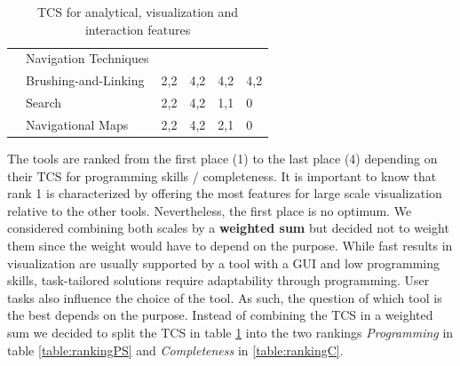 \begin{table}[H]
\begin{tabular}{|l| l l l l l|}
        \rowcolor{gray!30}\cellcolor{white}& Navigation Techniques & & & &\\\cline{2-6}
        & Brushing-and-Linking   & 2,2 & 4,2 & 4,2 & 4,2\\
        & Search                & 2,2 & 4,2 & 1,1 & 0 \\
        & Navigational Maps     & 2,2 & 4,2 & 2,1 & 0 \\
        \hline
    \end{tabular}
    \caption[\gls{TCS} for Analytical, Visualization and Interaction Features]{\gls{TCS} for analytical, visualization and interaction features}
    \label{table:TCS}
    \end{table}
    


 The tools are ranked from the first place  (1) to the last place (4) depending on their \gls{TCS} for programming skills / completeness.  It is important to know that rank 1 is characterized by offering the most features for large scale visualization relative to the other tools. Nevertheless, the first place is no optimum. We considered combining both scales by a \textbf{weighted sum} but decided not to weight them since the weight would have to depend on the purpose. While fast results in visualization are usually supported by a tool with a \gls{GUI} and low programming skills, task-tailored solutions require adaptability through programming. User tasks also influence the choice of the tool. As such, the question of which tool is the best depends on the purpose. Instead of combining the \gls{TCS} in a weighted sum we decided to split the \gls{TCS} in table \ref{table:TCS} into the two rankings \textit{Programming} in table \ref{table:rankingPS} and \textit{Completeness} in \ref{table:rankingC}.
 
